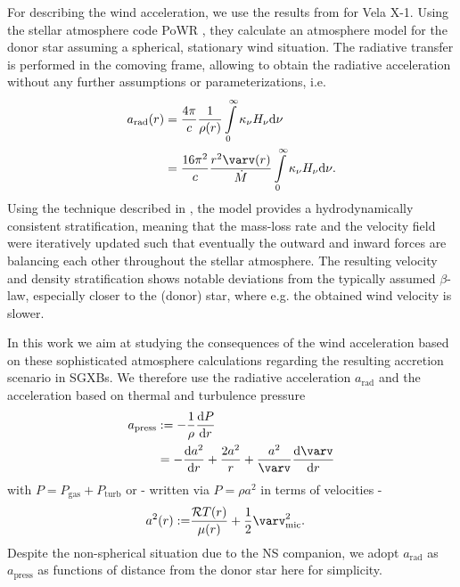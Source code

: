 
For describing the wind acceleration, we use the results from \citet{Sander+2018} for Vela X-1. Using the stellar
atmosphere code PoWR \citep[e.g.]{HamannKoesterke1998,Graefener+2002}, they calculate an atmosphere model for the donor star assuming a spherical, stationary
wind situation. The radiative transfer is performed in the comoving frame, allowing to obtain the radiative acceleration
without any further assumptions or parameterizations, i.e.
  \begin{align}
    \label{eq:araddef}
    a_\text{rad}(r) & = \frac{4\pi}{c} \frac{1}{\rho(r)}  \int\limits_{0}^{\infty} \kappa_\nu H_\nu \mathrm{d}\nu \\
                                & = \frac{16\pi^2}{c} \frac{r^2 \varv(r)}{\dot{M}} \int\limits_{0}^{\infty} \kappa_\nu H_\nu \mathrm{d}\nu\text{.}
  \end{align}  
Using the technique described in \citet{Sander+2017}, the model provides a hydrodynamically consistent 
stratification, meaning that the mass-loss rate and the velocity field were iteratively updated such that eventually
the outward and inward forces are balancing each other throughout the stellar atmosphere. The resulting velocity and
density stratification shows notable deviations from the typically assumed $\beta$-law, especially closer to the (donor)
star, where e.g. the obtained wind velocity is slower.

In this work we aim at studying the consequences of the wind acceleration based on these sophisticated atmosphere calculations regarding the resulting accretion scenario in SGXBs. We therefore use the radiative acceleration $a_\text{rad}$ and the acceleration based on thermal and turbulence pressure
  \begin{align} 
    \label{eq:apressdef}
    a_\text{press} & := -\frac{1}{\rho} \frac{\mathrm{d}P}{\mathrm{d}r} \\
                   & = - \frac{\mathrm{d}a^2}{\mathrm{d}r} + \frac{2 a^2}{r} + \frac{a^2}{\varv} \frac{\mathrm{d}\varv}{\mathrm{d}r}
  \end{align} 
\citep[cf.][]{Sander+2015} with $P = P_\text{gas} + P_\text{turb}$ or - written via $P = \rho a^2$ in terms of velocities - 
\begin{align}
  \label{eq:asounddef}
    a^2(r) := & \frac{\mathcal{R} T(r)}{\mu(r)} + \frac{1}{2} \varv_\text{mic}^2\text{.}
\end{align}
Despite the non-spherical situation due to the NS companion, we adopt $a_\text{rad}$ as $a_\text{press}$ as functions
of distance from the donor star here for simplicity.

